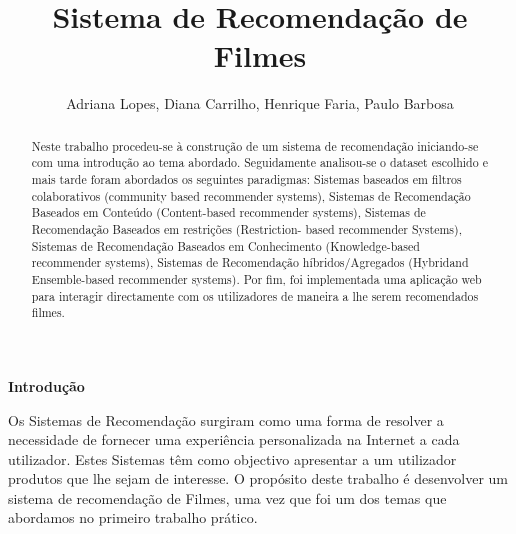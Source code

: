 

\title{Sistema de Recomendação de Filmes}

\author{Adriana Lopes, Diana Carrilho, Henrique Faria, Paulo Barbosa}





\maketitle

\begin{abstract}
Neste trabalho procedeu-se à construção de um sistema de recomendação iniciando-se com uma introdução ao tema abordado. Seguidamente analisou-se o dataset escolhido e mais tarde foram abordados os seguintes paradigmas: Sistemas baseados em filtros colaborativos (community based recommender systems), Sistemas de Recomendação Baseados em Conteúdo (Content-based recommender systems), Sistemas de Recomendação Baseados em restrições (Restriction- based recommender Systems), Sistemas de Recomendação Baseados em Conhecimento
(Knowledge-based recommender systems), Sistemas de Recomendação híbridos/Agregados (Hybridand Ensemble-based recommender systems). Por fim, foi implementada uma aplicação web para interagir directamente com os utilizadores de maneira a lhe serem recomendados filmes.\newline

\end{abstract}


\begin{center}
\normalsize{\bfseries Introdução}\hfill 
\end{center}

Os Sistemas de Recomendação surgiram como uma forma de resolver a necessidade de fornecer uma experiência personalizada na Internet a cada utilizador. Estes Sistemas têm como objectivo apresentar a um utilizador produtos que lhe sejam de interesse. 
O propósito deste trabalho é desenvolver um sistema de recomendação de Filmes, uma vez que foi um dos temas que abordamos no primeiro trabalho prático.


\newpage

